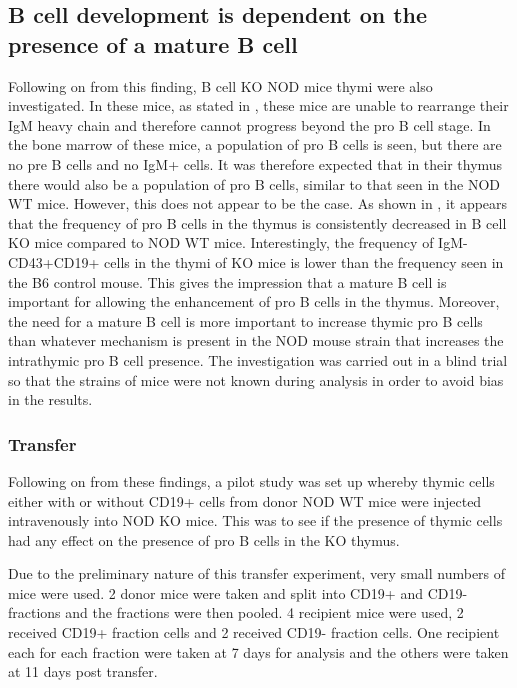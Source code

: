 

\subsection{B cell development is dependent on the presence of a mature B cell}

Following on from this finding, B cell KO NOD mice thymi were also investigated.
In these mice, as stated in , these mice are unable to rearrange their IgM heavy chain and therefore cannot progress beyond the pro B cell stage. 
In the bone marrow of these mice, a population of pro B cells is seen, but there are no pre B cells and no IgM+ cells.
It was therefore expected that in their thymus there would also be a population of pro B cells, similar to that seen in the NOD WT mice. 
However, this does not appear to be the case.
As shown in , it appears that the frequency of pro B cells in the thymus is consistently decreased in B cell KO mice compared to NOD WT mice.
Interestingly, the frequency of IgM-CD43+CD19+ cells in the thymi of KO mice is lower than the frequency seen in the B6 control mouse. 
This gives the impression that a mature B cell is important for allowing the enhancement of pro B cells in the thymus.
Moreover, the need for a mature B cell is more important to increase thymic pro B cells than whatever mechanism is present in the NOD mouse strain that increases the intrathymic pro B cell presence.
The investigation was carried out in a blind trial so that the strains of mice were not known during analysis in order to avoid bias in the results.

\subsubsection{Transfer}

Following on from these findings, a pilot study was set up whereby thymic cells either with or without CD19+ cells from donor NOD WT mice were injected intravenously into NOD KO mice.
This was to see if the presence of thymic cells had any effect on the presence of pro B cells in the KO thymus.

Due to the preliminary nature of this transfer experiment, very small numbers of mice were used.
2 donor mice were taken and split into CD19+ and CD19- fractions and the fractions were then pooled.
4 recipient mice were used, 2 received CD19+ fraction cells and 2 received CD19- fraction cells.
One recipient each for each fraction were taken at 7 days for analysis and the others were taken at 11 days post transfer.

